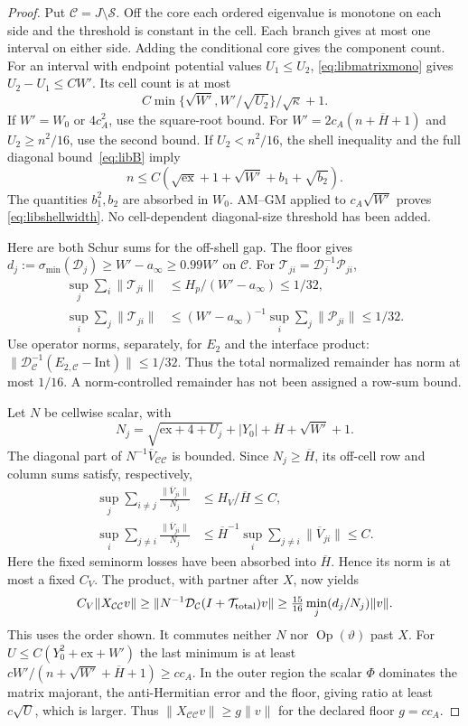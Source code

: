 \begin{proof}
Put $\mathcal C=J\setminus\mathcal S$.
Off the core each ordered eigenvalue is monotone on each side and
the threshold is constant in the cell. Each branch gives at most
one interval on either side. Adding the conditional core gives the
component count.
For an interval with endpoint potential values $U_1\le U_2$,
\eqref{eq:libmatrixmono} gives $U_2-U_1\le CW'$.
Its cell count is at most
\[
 C\min\{\sqrt{W'},W'/\sqrt{U_2}\}/\sqrt\kappa+1.
\]
If $W'=W_0$ or $4c_A^2$, use the square-root bound.
For $W'=2c_A(n+\overline H+1)$ and $U_2\ge n^2/16$, use the second
bound. If $U_2<n^2/16$, the shell inequality and the full diagonal
bound~\eqref{eq:libB} imply
\[
 n\le C(\sqrt{\mathrm{ex}}+1+\sqrt{W'}+b_1+\sqrt{b_2}).
\]
The quantities $b_1^2,b_2$ are absorbed in $W_0$.
AM--GM applied to $c_A\sqrt{W'}$ proves
\eqref{eq:libshellwidth}.
No cell-dependent diagonal-size threshold has been added.

Here are both Schur sums for the off-shell gap. The floor gives
$d_j:=\sigma_{\min}(\mathcal D_j)\ge W'-a_\infty\ge0.99W'$ on
$\mathcal C$. For $\mathcal T_{ji}=\mathcal D_j^{-1}\mathcal P_{ji}$,
\begin{align*}
 \sup_j\sum_i\|\mathcal T_{ji}\|&\le H_p/(W'-a_\infty)\le1/32,\\
 \sup_i\sum_j\|\mathcal T_{ji}\|&\le
       (W'-a_\infty)^{-1}\sup_i\sum_j\|\mathcal P_{ji}\|\le1/32.
\end{align*}
Use operator norms, separately, for $E_2$ and the interface product:
$\|\mathcal D_{\mathcal C}^{-1}(E_{2,\mathcal C}
 -\mathrm{Int})\|\le1/32$.
Thus the total normalized remainder has norm at most $1/16$.
A norm-controlled remainder has not been assigned a row-sum bound.

Let $N$ be cellwise scalar, with
\[
 N_j=\sqrt{\mathrm{ex}+4+U_j}+|Y_0|+\overline H+\sqrt{W'}+1.
\]
The diagonal part of $N^{-1}\overline V_{\mathcal C\mathcal C}$
is bounded. Since $N_j\ge\overline H$, its off-cell row and column
sums satisfy, respectively,
\begin{align*}
 \sup_j\sum_{i\ne j}\frac{\|\overline V_{ji}\|}{N_j}
     &\le H_V/\overline H\le C,\\
 \sup_i\sum_{j\ne i}\frac{\|\overline V_{ji}\|}{N_j}
     &\le\overline H^{-1}\sup_i\sum_{j\ne i}
                       \|\overline V_{ji}\|\le C.
\end{align*}
Here the fixed seminorm losses have been absorbed into $\overline H$.
Hence its norm is at most a fixed $C_V$.
The product, with partner after $X$, now yields
\[
 C_V\|X_{\mathcal C\mathcal C}v\|
 \ge\|N^{-1}\mathcal D_{\mathcal C}(I+\mathcal T_{\rm total})v\|
 \ge\tfrac{15}{16}\min_j(d_j/N_j)\|v\|.
\]
This uses the order shown. It commutes neither $N$ nor
$\operatorname{Op}(\vartheta)$ past $X$.
For $U\le C(Y_0^2+\mathrm{ex}+W')$ the last minimum is at least
$cW'/(n+\sqrt{W'}+\overline H+1)\ge cc_A$.
In the outer region the scalar $\Phi$ dominates the matrix
majorant, the anti-Hermitian error and the floor, giving ratio at
least $c\sqrt U$, which is larger. Thus
$\|X_{\mathcal C\mathcal C}v\|\ge g\|v\|$ for the declared floor
$g=cc_A$.


\end{proof}
